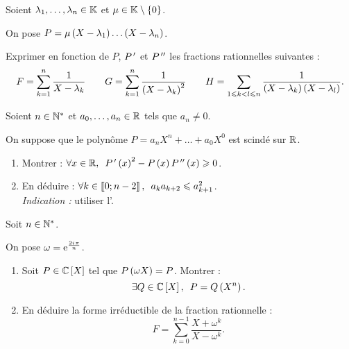\begin{corr}
\end{corr}

\begin{exo}
Soient \(\lambda_1,\dots,\lambda_n\in\mathbb{K}\) et \(\mu\in\mathbb{K}\setminus\left\lbrace0\right\rbrace\).

On pose \(P=\mu\left(X-\lambda_1\right)\dots\left(X-\lambda_n\right)\).

Exprimer en fonction de \(P\), \(P^{\,\prime}\) et \(P^{\,\prime\prime}\) les fractions rationnelles suivantes : \[F=\sum_{k=1}^n\dfrac{1}{X-\lambda_k}\qquad G=\sum_{k=1}^n\dfrac{1}{\left(X-\lambda_k\right)^2}\qquad H=\sum_{1\leqslant k<l\leqslant n}\dfrac{1}{\left(X-\lambda_k\right)\left(X-\lambda_l\right)}.\]
\end{exo}

\begin{corr}
\end{corr}

\begin{exo}
Soient \(n\in\mathbb{N}^*\) et \(a_0,\dots,a_n\in\mathbb{R}\) tels que \(a_n\not=0\).

On suppose que le polynôme \(P=a_nX^n+\dots+a_0X^0\) est scindé sur \(\mathbb{R}\).

\begin{enumerate}
\item Montrer : \(\quantifs{\forall x\in\R}P\prim\paren{x}^2-P\paren{x}P\seconde\paren{x}\geq0\). \\

\item En déduire : \(\quantifs{\forall k\in\interventierii{0}{n-2}}a_ka_{k+2}\leq a_{k+1}^2\). \\

\textit{Indication :} utiliser l'.
\end{enumerate}
\end{exo}

\begin{corr}
\end{corr}

\begin{exo}
Soit \(n\in\mathbb{N}^*\).

On pose \(\omega=\mathrm{e}^{\frac{2i\mkern1mu\pi}{n}}\).

\begin{enumerate}
\item Soit \(P\in\poly[\C]\) tel que \(P\left(\omega X\right)=P\). Montrer : \[\quantifs{\exists Q\in\poly[\C]}P=Q\paren{X^n}.\]

\item En déduire la forme irréductible de la fraction rationnelle : \[F=\sum_{k=0}^{n-1}\dfrac{X+\omega^k}{X-\omega^k}.\]
\end{enumerate}
\end{exo}

